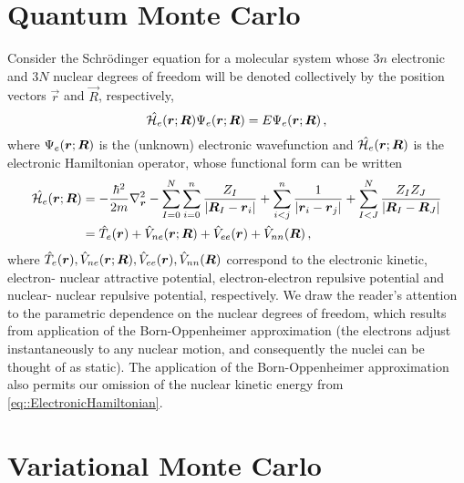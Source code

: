 \section{Quantum Monte Carlo}
Consider the Schr\"{o}dinger equation for a molecular system whose $3n$ electronic
and $3N$ nuclear degrees of freedom will be denoted collectively by the position
vectors $\vec{r}$ and $\vec{R}$, respectively,
%
\begin{equation}\label{eq::ElectronicSchrodinger}
  \hat{\mathcal{H}_e}(\boldsymbol{r};\boldsymbol{R})\Psi_e(\boldsymbol{r};\boldsymbol{R}) = E\Psi_e(\boldsymbol{r};\boldsymbol{R}) \,,
\end{equation}
%
where $\Psi_e(\boldsymbol{r};\boldsymbol{R})$ is the (unknown) electronic wavefunction and $\hat{\mathcal{H}_e}(\boldsymbol{r};\boldsymbol{R})$ is the
electronic Hamiltonian operator, whose functional form can be written
%
\begin{align}\label{eq::ElectronicHamiltonian}
  \hat{\mathcal{H}_e}(\boldsymbol{r};\boldsymbol{R}) &=
  - \frac{\hbar^2}{2m}\nabla^2_{\boldsymbol{r}}
  - \sum_{I=0}^N\sum_{i=0}^n \frac{Z_I}{|\boldsymbol{R}_I - \boldsymbol{r}_i|}
  + \sum_{i<j}^n \frac{1}{|\boldsymbol{r}_i - \boldsymbol{r}_j|}
  + \sum_{I<J}^N \frac{Z_IZ_J}{|\boldsymbol{R}_I - \boldsymbol{R}_J|} \nonumber \\
  &= \hat{T}_e(\boldsymbol{r}) + \hat{V}_{ne}(\boldsymbol{r};\boldsymbol{R}) + \hat{V}_{ee}(\boldsymbol{r}) + \hat{V}_{nn}(\boldsymbol{R}) \,,
\end{align}
%
where $\hat{T}_e(\boldsymbol{r}), \hat{V}_{ne}(\boldsymbol{r};\boldsymbol{R}), \hat{V}_{ee}(\boldsymbol{r}), \hat{V}_{nn}(\boldsymbol{R})$ correspond to the electronic kinetic, electron-
nuclear attractive potential, electron-electron repulsive potential and nuclear-
nuclear repulsive potential, respectively.
We draw the reader's attention to the parametric dependence on the nuclear
degrees of freedom, which results from application of the Born-Oppenheimer
approximation (the electrons adjust instantaneously to any nuclear motion, and
consequently the nuclei can be thought of as static). The application of the
Born-Oppenheimer approximation also permits our omission of the nuclear kinetic
energy from \eqref{eq::ElectronicHamiltonian}.

\section{Variational Monte Carlo}

